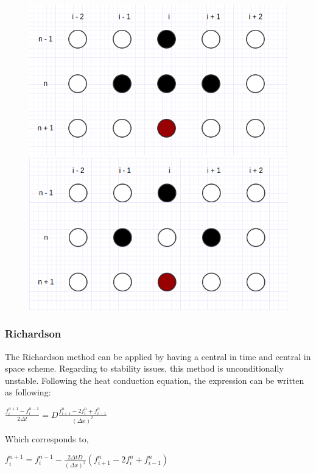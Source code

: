 \documentclass[12pt]{report}
\begin{document}
\begin{figure}[!htb]
\centering
\begin{minipage}{.5\textwidth}
  \centering
  \includegraphics[width=.8\linewidth]{richardson.png}
\end{minipage}%
\begin{minipage}{.5\textwidth}
  \centering
  \includegraphics[width=.8\linewidth]{dufort-frankel.png}
\end{minipage}
\end{figure}

\subsubsection*{Richardson}
The Richardson method can be applied by having a central in time and central in space scheme. Regarding to stability issues, this method is unconditionally unstable. Following the heat conduction equation, the expression can be written as following:
\begin{center}
\Large
$
\frac{f_i^{n + 1} - f_i^{n - 1}}{2 \Delta t} = D \frac{f_{i + 1}^{n} - 2f_{i}^{n} + f_{i - 1}^{n}}{(\Delta x)^2}
$
\end{center}
\par Which corresponds to,
\begin{center}
\Large
$
f_{i}^{n + 1} = f_{i}^{n - 1} - \frac{2\Delta t D}{(\Delta x)^2} (f_{i + 1}^{n} - 2 f_{i}^{n} + f_{i - 1}^{n})
$
\end{center}
\end{document}
